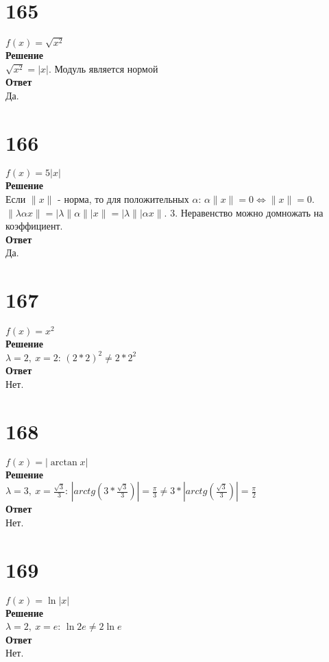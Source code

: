 \documentclass[a4paper]{article}
\begin{document}
\section*{165}
$f(x) = \sqrt{x^2}$\\
\textbf{Решение}\\
$\sqrt{x^2} = |x|$. Модуль является нормой\\
\textbf{Ответ}\\Да.

\section*{166}
$f(x) = 5 |x|$\\
\textbf{Решение}\\
Если $\|x\|$ - норма, то для положительных $\alpha$: $\alpha\|x\|=0 \Leftrightarrow \|x\|=0$. $\|\lambda \alpha x\| = |\lambda\|\alpha\||x\| = |\lambda\||\alpha x\|$. 
3. Неравенство можно домножать на коэффициент.\\
\textbf{Ответ}\\Да.

\section*{167}
$f(x) = x^2$\\
\textbf{Решение}\\
$\lambda = 2,\ x = 2$:  $(2*2)^2 \neq 2*2^2$\\
\textbf{Ответ}\\Нет.

\section*{168}
$f(x) = |\arctan x| $\\
\textbf{Решение}\\
$\lambda = 3,\ x = \frac{\sqrt{3}}{3}$:  $|arctg(3*\frac{\sqrt{3}}{3})| = \frac{\pi}{3} \neq 3*|arctg(\frac{\sqrt{3}}{3})| = \frac{\pi}{2}$\\
\textbf{Ответ}\\Нет.

\section*{169}
$f(x) = \ln |x| $\\
\textbf{Решение}\\
$\lambda = 2,\ x = e$:  $\ln 2e \neq 2\ln e$\\
\textbf{Ответ}\\Нет.
\end{document}
